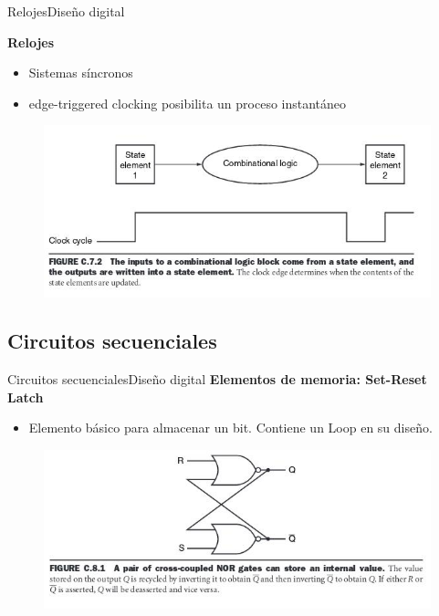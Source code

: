 \documentclass[aspectratio=169,compress]{beamer}
\begin{document}
\begin{footnotesize}
\begin{frame}{Relojes}{Diseño digital}
\begin{center}\textbf{Relojes}\end{center}
\begin{itemize}
\item Sistemas síncronos
\item edge-triggered clocking posibilita un proceso instantáneo
\end{itemize}
\begin{figure}
\includegraphics[scale=0.4]{images/reloj-estado-combinacional.jpg} 
\end{figure}
\end{frame}


\subsection{Circuitos secuenciales}

\begin{frame}{Circuitos secuenciales}{Diseño digital}
\bigskip
\textbf{Elementos de memoria: Set-Reset Latch}
\begin{itemize}
\item Elemento básico para almacenar un bit. Contiene un Loop en su diseño.
\end{itemize}
\bigskip
\begin{figure}
\includegraphics[scale=0.4]{images/latch-s-r.jpg} 
\end{figure}
\end{frame}


\end{footnotesize}
\end{document}
